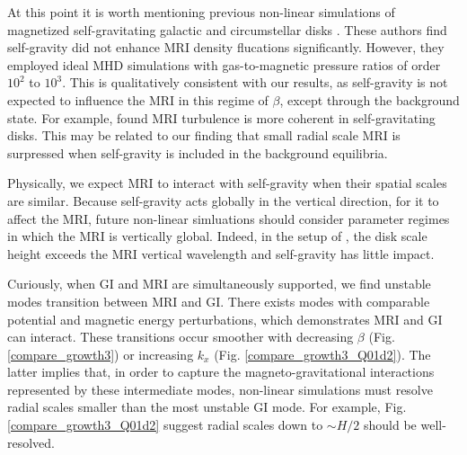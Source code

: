 
At this point it is worth mentioning previous non-linear simulations 
of magnetized self-gravitating galactic and circumstellar disks
\citep{kim03,fromang04a,fromang04}. These authors find self-gravity
did not enhance MRI density flucations significantly. However, they
employed ideal MHD simulations with gas-to-magnetic pressure ratios of
order $10^2$ to $10^3$. %
This is qualitatively consistent with our results, as 
self-gravity is not expected to influence the MRI in this  
regime of $\beta$, except through the background state. 
For example, \cite{fromang04} found
MRI turbulence is more coherent in self-gravitating disks. This may be related
to our finding that small radial scale MRI is surpressed when
self-gravity is included in the background equilibria. 

Physically, we expect MRI to interact with self-gravity when
their spatial scales are similar. Because self-gravity acts globally in the
vertical direction, for it to affect the MRI, future non-linear
simluations should consider parameter regimes in which the MRI is
vertically global. %
Indeed, in the setup of \cite{kim03}, the disk
scale height exceeds the MRI vertical wavelength and self-gravity has
little impact.   



Curiously, when GI and MRI are simultaneously supported, we find
unstable modes transition between MRI and GI. There exists modes 
with comparable potential and magnetic energy perturbations, which 
demonstrates MRI and GI can interact. These 
transitions occur smoother with decreasing $\beta$
(Fig. \ref{compare_growth3}) or increasing $k_x$
(Fig. \ref{compare_growth3_Q01d2}). The latter implies that, in order
to capture the magneto-gravitational interactions represented by these
intermediate modes, non-linear simulations must resolve radial scales
smaller than the most unstable GI mode. For example, 
Fig. \ref{compare_growth3_Q01d2} suggest radial scales down to $\sim H/2$
should be well-resolved. 


